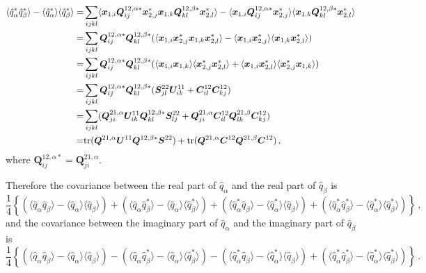 \documentclass[12pt,a4paper]{article}
\begin{document}
\begin{align}
\langle \hat{q}_\alpha^* \hat{q}_\beta^*\rangle - \langle \hat{q}_\alpha^* \rangle\langle \hat{q}_\beta^*\rangle=&
\sum_{ijkl}\langle \bm{x}_{1,i}\bm{Q}^{12,\alpha*}_{ij}\bm{x}_{2,j}^*\bm{x}_{1,k}\bm{Q}^{12,\beta*}_{kl}\bm{x}_{2,l}^*\rangle - \langle \bm{x}_{1,i}\bm{Q}^{12,\alpha*}_{ij}\bm{x}_{2,j}^*\rangle\langle \bm{x}_{1,k}\bm{Q}^{12,\beta*}_{kl}\bm{x}_{2,l}^*\rangle \notag\\
=&\sum_{ijkl} \bm{Q}^{12,\alpha*}_{ij}\bm{Q}^{12,\beta*}_{kl}(\langle \bm{x}_{1,i}\bm{x}_{2,j}^* \bm{x}_{1,k}\bm{x}_{2,l}^*\rangle - \langle \bm{x}_{1,i}\bm{x}_{2,j}^*\rangle\langle \bm{x}_{1,k}\bm{x}_{2,l}^*\rangle)\notag\\
=&\sum_{ijkl}  \bm{Q}^{12,\alpha*}_{ij}\bm{Q}^{12,\beta*}_{kl}(\langle \bm{x}_{1,i}\bm{x}_{1,k}\rangle \langle \bm{x}_{2,j}^*\bm{x}_{2,l}^*\rangle + \langle \bm{x}_{1,i}\bm{x}_{2,l}^*\rangle\langle \bm{x}_{2,j}^*\bm{x}_{1,k}\rangle)\notag\\
=&\sum_{ijkl} \bm{Q}^{12,\alpha*}_{ij}\bm{Q}^{12,\beta*}_{kl} ( \bm{S}_{jl}^{22}\bm{U}_{ik}^{11} + \bm{C}^{12}_{il}\bm{C}^{12}_{kj})\notag\\
=&\sum_{ijkl}( \bm{Q}^{21,\alpha}_{ji}\bm{U}_{ik}^{11}\bm{Q}^{12,\beta*}_{kl} \bm{S}_{lj}^{22} + \bm{Q}^{21,\alpha}_{ji}\bm{C}^{12}_{il} \bm{Q}^{21,\beta}_{lk} \bm{C}^{12}_{kj} ) \notag\\
=&\text{tr}(\bm{Q}^{21,\alpha} \bm{U}^{11} \bm{Q}^{12,\beta*} \bm{S}^{22}) + \text{tr}( \bm{Q}^{21,\alpha} \bm{C}^{12} \bm{Q}^{21,\beta} \bm{C}^{12})\,,
\end{align}
where $\bm{Q}^{12,\alpha*}_{ij}= \bm{Q}^{21,\alpha}_{ji}$.

Therefore the covariance between the real part of $\hat{q}_\alpha$ and the real part of $\hat{q}_\beta$ is
\begin{equation}
    \frac{1}{4}\left\{ (\langle \hat{q}_\alpha \hat{q}_\beta \rangle - \langle \hat{q}_\alpha \rangle\langle \hat{q}_\beta \rangle) + (\langle \hat{q}_\alpha  \hat{q}_\beta^* \rangle - \langle \hat{q}_\alpha \rangle\langle \hat{q}_\beta ^*\rangle) + (\langle \hat{q}_\alpha^*  \hat{q}_\beta \rangle - \langle \hat{q}_\alpha^* \rangle\langle \hat{q}_\beta \rangle)
        + (\langle \hat{q}_\alpha ^*  \hat{q}_\beta ^*\rangle - \langle \hat{q}_\alpha^*\rangle\langle \hat{q}_\beta^*\rangle) \right\}\,,
\end{equation}
and the covariance between the imaginary part of $\hat{q}_\alpha$ and the imaginary part of $\hat{q}_\beta$ is
\begin{equation}
    \frac{1}{4}\left\{ (\langle \hat{q}_\alpha \hat{q}_\beta \rangle - \langle \hat{q}_\alpha \rangle\langle \hat{q}_\beta \rangle) - (\langle \hat{q}_\alpha  \hat{q}_\beta^* \rangle - \langle \hat{q}_\alpha \rangle\langle \hat{q}_\beta ^*\rangle) - (\langle \hat{q}_\alpha^*  \hat{q}_\beta \rangle - \langle \hat{q}_\alpha^* \rangle\langle \hat{q}_\beta \rangle)
        + (\langle \hat{q}_\alpha ^*  \hat{q}_\beta ^*\rangle - \langle \hat{q}_\alpha^*\rangle\langle \hat{q}_\beta^*\rangle) \right\}\,.
\end{equation}
\end{document}
